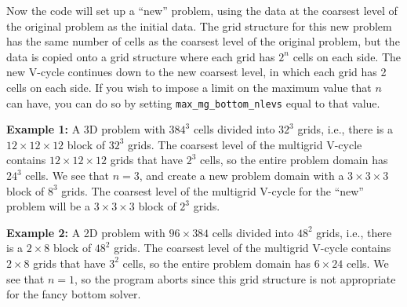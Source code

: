 Now the code will set up a ``new'' problem, using the data at the coarsest level
of the original problem as the initial data.  The grid structure for this new
problem has the same number of cells as the coarsest level of the original problem,
but the data is copied onto a grid structure where each grid has $2^n$ cells
on each side.  The new V-cycle continues down to the new coarsest level, in
which each grid has 2 cells on each side.  If you wish to impose a limit on
the maximum value that $n$ can have, you can do so by setting 
{\tt max\_mg\_bottom\_nlevs} equal to that value.

{\bf Example 1:} A 3D problem with $384^3$ cells divided into $32^3$ grids, i.e., 
there is a $12\times 12\times 12$ block of $32^3$ grids.  The coarsest level of the 
multigrid V-cycle contains $12\times 12\times 12$ grids that have $2^3$ cells, so the 
entire problem domain has $24^3$ cells.  We see that $n=3$, and create a new problem 
domain with a $3\times 3\times 3$ block of $8^3$ grids.  The coarsest level of the 
multigrid V-cycle for the ``new'' problem will be a $3\times 3\times 3$ block of 
$2^3$ grids.

{\bf Example 2:} A 2D problem with $96\times 384$ cells divided into $48^2$ grids, i.e., 
there is a $2\times 8$ block of $48^2$ grids.  The coarsest level of the multigrid 
V-cycle contains $2\times 8$ grids that have $3^2$ cells, so the entire problem 
domain has $6\times 24$ cells.  We see that $n=1$, so the program aborts since this grid
structure is not appropriate for the fancy bottom solver.
